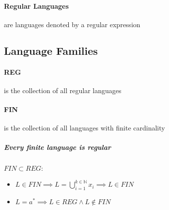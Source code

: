 \documentclass{article}
\newcommand{\N}{\mathds{N}}
\begin{document}
\paragraph{Regular Languages} are languages denoted by a regular expression
\subsection{Language Families}
\paragraph{REG} is the collection of all regular languages
\paragraph{FIN} is the collection of all languages with finite cardinality
\subparagraph{Every finite language is regular} $FIN \subset REG$: 
\begin{itemize}
\item $L\in FIN \implies L = \bigcup_{i=1}^{k \in \N} x_i \implies L \in FIN$
\item $L=a^* \implies L \in REG \wedge L \notin FIN$
\end{itemize}
\end{document}
